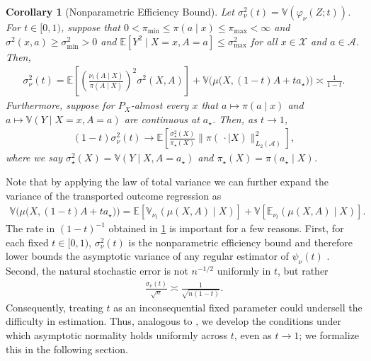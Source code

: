 \documentclass[11pt,twoside]{article}
\newtheorem{corollary}{Corollary}
\theoremstyle{definition}
\theoremstyle{remark}
\begin{document}
\begin{corollary}[Nonparametric Efficiency Bound] \label{var_corollary}
    Let $\sigma^2_\nu(t) = \mathbb{V}(\varphi_\nu(Z; t))$. For $t \in [0, 1)$, suppose that $0 < \pi_{\min} \leq \pi(a \! \mid \! x) \leq \pi_{\max} < \infty$ and $\sigma^2(x, a) \geq \sigma^2_{\min} > 0$ and $\mathbb{E}[Y^2 \mid X = x, A = a] \leq \sigma^2_{\max}$ for all $x \in \mathcal{X}$ and $a \in \mathcal{A}$.  Then, 
    \begin{align*}
    \sigma^2_\nu(t) = \mathbb{E}\! \left[ \left(\frac{\nu_t(A\mid X)}{\pi(A\mid X)}\right)^2 \sigma^2(X, A)  \right] + \mathbb{V}\big(\mu\big(X, (1 - t)A + ta_\star\big)\big) \asymp \frac{1}{1-t} .
    \end{align*}
    Furthermore, suppose for $P_X$-almost every $x$ that $a \mapsto \pi(a \! \mid \! x)$ and $a \mapsto \mathbb{V}(Y \mid X = x, A=a)$ are continuous at $a_\star$. Then, as $t \to 1$,
    \begin{align*}
        (1-t)\sigma^2_\nu(t) \longrightarrow  \mathbb{E}\! \left[\frac{\sigma^2_\star(X)}{\pi_\star(X)} \| \pi(\, \cdot \mid X) \|^2_{L_2(\mathcal{A})} \right],
    \end{align*}
where we say $\sigma^2_\star(X) = \mathbb{V}(Y \mid X, A = a_\star)$ and $\pi_{\star}(X) = \pi(a_\star \mid X)$.
\end{corollary}
Note that by applying the law of total variance we can further expand the variance of the transported outcome regression as
\begin{align*}
    \mathbb{V}\big(\mu\big(X, (1 - t)A + ta_\star\big)\big) = \mathbb{E}\left[ \mathbb{V}_{\nu_t}(\mu(X,A)\mid X)\right] +\mathbb{V}\left[ \mathbb{E}_{\nu_t}(\mu(X,A)\mid X) \right].
\end{align*}
The rate in $(1-t)^{-1}$ obtained in \cref{var_corollary} is important for a few reasons.  First, for each fixed $t \in [0, 1)$, $\sigma_\nu^2(t)$ is the nonparametric efficiency bound and therefore lower bounds the asymptotic variance of any regular estimator of $\psi_\nu(t)$ \citep{van2000asymptotic}. Second, the natural stochastic error is not $n^{-1/2}$ uniformly in $t$, but rather
\begin{align*}
    \frac{\sigma_\nu(t)}{\sqrt{n}}
    \asymp
    \frac{1}{\sqrt{n(1-t)}}.
\end{align*}
Consequently, treating $t$ as an inconsequential fixed parameter could undersell the difficulty in estimation. Thus, analogous to \cite{schindl2024incremental}, we develop the conditions under which asymptotic normality holds uniformly across $t$, even as $t \to 1$; we formalize this in the following section.
\end{document}
